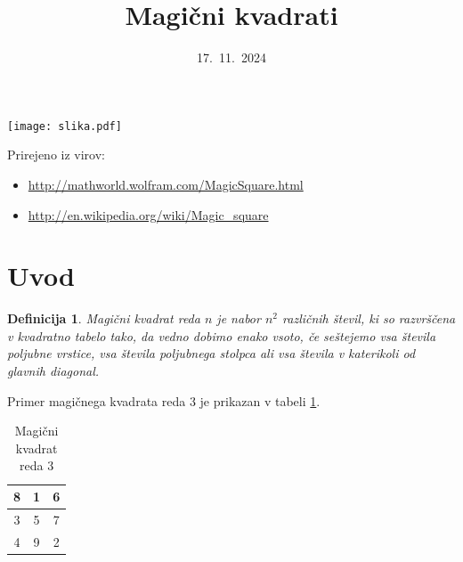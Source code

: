 \documentclass[a4paper,12pt]{article}
\title{Magični kvadrati}
\date{17.\ 11.\ 2024}
\newtheorem{definicija}{Definicija}
\newcommand{\pojem}[1]{\emph{\color{purple}#1}}
\begin{document}
\maketitle
\begin{center}
   \texttt{[image: slika.pdf]}
\end{center}

Prirejeno iz virov:

\begin{itemize}
   \item \url{http://mathworld.wolfram.com/MagicSquare.html}
   \item \url{http://en.wikipedia.org/wiki/Magic_square}
\end{itemize}

\tableofcontents

\newpage

\section{Uvod}

\begin{definicija}
   \pojem{Magični kvadrat} reda $n$ je nabor $n^2$ različnih števil,
   ki so razvrščena v kvadratno tabelo tako, da vedno dobimo enako vsoto,
   če seštejemo vsa števila poljubne vrstice, vsa števila poljubnega
   stolpca ali vsa števila v katerikoli od glavnih diagonal.
\end{definicija}

Primer magičnega kvadrata reda 3 je prikazan v tabeli \ref{table:mag3}.

\begin{table}[h]
   \caption{Magični kvadrat reda 3}
   \label{table:mag3}
   \large
   \centering
   \begin{tabular}{|c|c|c|}
      \hline
      8 & 1 & 6 \\\hline
      3 & 5 & 7 \\\hline
      4 & 9 & 2 \\\hline
   \end{tabular}
\end{table}
\end{document}
